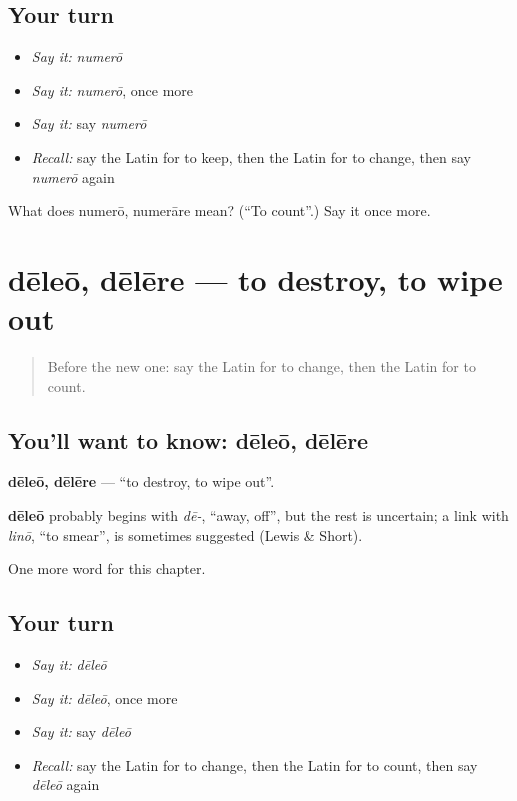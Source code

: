 \subsection*{Your turn}
\begin{itemize}
\raggedright
  \item \emph{Say it:} \emph{numerō}
  \item \emph{Say it:} \emph{numerō}, once more
  \item \emph{Say it:} say \emph{numerō}
  \item \emph{Recall:} say the Latin for to keep, then the Latin for to change, then say \emph{numerō} again
\end{itemize}

\begin{tcolorbox}[breakable,colback=teal!4,colframe=teal!35!black,title={Before you move on}]
What does numerō, numerāre mean? (\textquotedblleft{}To count\textquotedblright{}.) Say it once more.
\end{tcolorbox}
\section[dēleō, dēlēre]{dēleō, dēlēre — to destroy, to wipe out}

\label{lesson:LA-C160-deleo}



\begin{quote}
Before the new one: say the Latin for to change, then the Latin for to count.
\end{quote}

\subsection*{You'll want to know: dēleō, dēlēre}
\textbf{dēleō, dēlēre} — \textquotedblleft{}to destroy, to wipe out\textquotedblright{}.

\begin{cousinweb}
\textbf{dēleō} probably begins with \emph{dē-}, \textquotedblleft{}away, off\textquotedblright{}, but the rest is uncertain; a link with \emph{linō}, \textquotedblleft{}to smear\textquotedblright{}, is sometimes suggested (Lewis \& Short).
\end{cousinweb}

\begin{grammarlens}[title={What you've built}]
One more word for this chapter.
\end{grammarlens}

\subsection*{Your turn}
\begin{itemize}
\raggedright
  \item \emph{Say it:} \emph{dēleō}
  \item \emph{Say it:} \emph{dēleō}, once more
  \item \emph{Say it:} say \emph{dēleō}
  \item \emph{Recall:} say the Latin for to change, then the Latin for to count, then say \emph{dēleō} again
\end{itemize}

